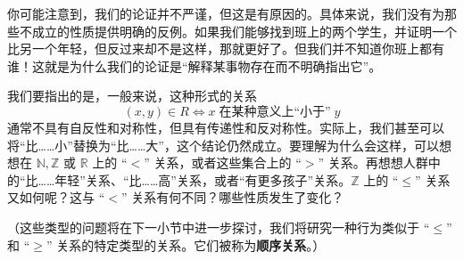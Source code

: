 你可能注意到，我们的论证并不严谨，但这是有原因的。具体来说，我们没有为那些不成立的性质提供明确的反例。如果我们能够找到班上的两个学生，并证明一个比另一个年轻，但反过来却不是这样，那就更好了。但我们并不知道你班上都有谁！这就是为什么我们的论证是``解释某事物存在而不明确指出它''。

我们要指出的是，一般来说，这种形式的关系
\[(x, y) \in R \iff x \;\text{在某种意义上``小于''}\; y\]
通常不具有自反性和对称性，但具有传递性和反对称性。实际上，我们甚至可以将``比……小''替换为``比……大''，这个结论仍然成立。要理解为什么会这样，可以想想在 $\mathbb{N}, \mathbb{Z}$ 或 $\mathbb{R}$ 上的 ``$<$'' 关系，或者这些集合上的 ``$>$'' 关系。再想想人群中的``比……年轻''关系、``比……高''关系，或者``有更多孩子''关系。$\mathbb{Z}$ 上的 ``$\le$'' 关系又如何呢？这与 ``$<$'' 关系有何不同？哪些性质发生了变化？

（这些类型的问题将在下一小节中进一步探讨，我们将研究一种行为类似于 ``$\le$'' 和 ``$\ge$'' 关系的特定类型的关系。它们被称为\textbf{顺序关系}。）
